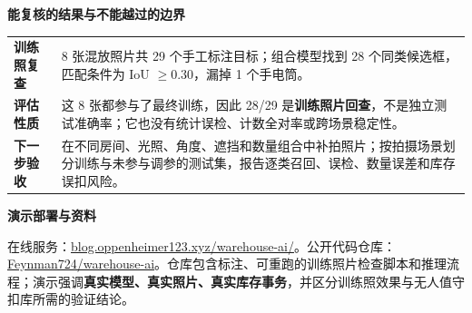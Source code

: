 \documentclass[UTF8,fontset=none,11pt,a4paper]{ctexart}
\newcommand{\smalllabel}[1]{{\footnotesize\bfseries\color{forest}#1}}
\begin{document}
\vspace{5mm}
\smalllabel{能复核的结果与不能越过的边界}\par\vspace{2mm}
\begin{tabularx}{\linewidth}{@{}>{\bfseries}p{31mm}X@{}}
\color{forest}训练照复查 & 8 张混放照片共 29 个手工标注目标；组合模型找到 28 个同类候选框，匹配条件为 IoU $\geq 0.30$，漏掉 1 个手电筒。\\
\color{forest}评估性质 & 这 8 张都参与了最终训练，因此 28/29 是\textbf{训练照片回查}，不是独立测试准确率；它也没有统计误检、计数全对率或跨场景稳定性。\\
\color{forest}下一步验收 & 在不同房间、光照、角度、遮挡和数量组合中补拍照片；按拍摄场景划分训练与未参与调参的测试集，报告逐类召回、误检、数量误差和库存误扣风险。\\
\end{tabularx}

\vspace{5mm}
\begin{softbox}
\smalllabel{演示部署与资料}\par\vspace{2mm}
{\small 在线服务：\href{https://blog.oppenheimer123.xyz/warehouse-ai/}{blog.oppenheimer123.xyz/warehouse-ai/}。公开代码仓库：\href{https://github.com/Feynman724/warehouse-ai}{Feynman724/warehouse-ai}。仓库包含标注、可重跑的训练照片检查脚本和推理流程；演示强调\textbf{真实模型、真实照片、真实库存事务}，并区分训练照效果与无人值守扣库所需的验证结论。}
\end{softbox}
\end{document}
